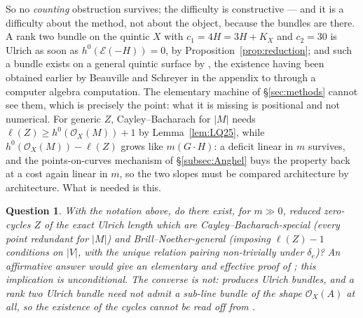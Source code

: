 \documentclass[10pt,a4paper]{amsart}
\newtheorem{question}[theorem]{Question}
\newcommand{\OO}{\mathcal{O}}
\newcommand{\EE}{\mathcal{E}}
\newcommand{\len}{\ell}
\begin{document}
So no \emph{counting} obstruction survives; the difficulty is constructive --- and it is a difficulty about the method, not about the object, because the bundles are there. A rank two bundle on the quintic $X$ with $c_1=4H=3H+K_X$ and $c_2=30$ is Ulrich as soon as $h^0(\EE(-H))=0$, by Proposition~\ref{prop:reduction}; and such a bundle exists on a general quintic surface by \cite[Thm.~6.13]{CF09}, the existence having been obtained earlier by Beauville and Schreyer in the appendix to \cite{Bea00} through a computer algebra computation. The elementary machine of \S\ref{sec:methods} cannot see them, which is precisely the point: what it is missing is positional and not numerical. For generic $Z$, Cayley--Bacharach for $|M|$ needs $\len(Z)\ge h^0(\OO_X(M))+1$ by Lemma~\ref{lem:LQ25}, while $h^0(\OO_X(M))-\len(Z)$ grows like $m(G\cdot H)$: a deficit linear in $m$ survives, and the points-on-curves mechanism of \S\ref{subsec:Anghel} buys the property back at a cost again linear in $m$, so the two slopes must be compared architecture by architecture. What is needed is this.

\begin{question}\label{q:cycles}
With the notation above, do there exist, for $m\gg0$, reduced zero-cycles $Z$ of the exact Ulrich length which are \emph{Cayley--Bacharach-special} \textup{(}every point redundant for $|M|$\textup{)} and \emph{Brill--Noether-general} \textup{(}imposing $\len(Z)-1$ conditions on $|V|$, with the unique relation pairing non-trivially under $\delta_e$\textup{)}? An affirmative answer would give an elementary and effective proof of \cite[Thm.~1.2]{CH20}; this implication is unconditional. The converse is not: \cite{CH20} produces Ulrich bundles, and a rank two Ulrich bundle need not admit a sub-line bundle of the shape $\OO_X(A)$ at all, so the existence of the cycles cannot be read off from \cite{CH20}.
\end{question}
\end{document}
